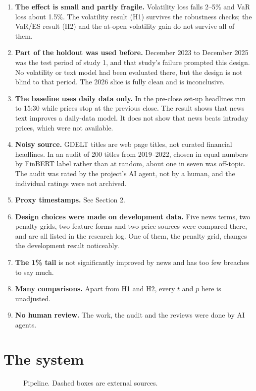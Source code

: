 \documentclass[11pt,a4paper]{article}
\begin{document}
\begin{enumerate}
\item \textbf{The effect is small and partly fragile.} Volatility loss falls 2--5\% and VaR
loss about 1.5\%. The volatility result (H1) survives the robustness checks; the VaR/ES result
(H2) and the at-open volatility gain do not survive all of them.
\item \textbf{Part of the holdout was used before.} December 2023 to December 2025 was the test
period of study 1, and that study's failure prompted this design. No volatility or text model
had been evaluated there, but the design is not blind to that period. The 2026 slice is fully
clean and is inconclusive.
\item \textbf{The baseline uses daily data only.} In the pre-close set-up headlines run to
15:30 while prices stop at the previous close. The result shows that news text improves a
daily-data model. It does not show that news beats intraday prices, which were not available.
\item \textbf{Noisy source.} GDELT titles are web page titles, not curated financial headlines.
In an audit of 200 titles from 2019--2022, chosen in equal numbers by FinBERT label rather than
at random, about one in seven was off-topic. The audit was rated by the project's AI agent,
not by a human, and the individual ratings were not archived.
\item \textbf{Proxy timestamps.} See Section 2.
\item \textbf{Design choices were made on development data.} Five news terms, two penalty grids,
two feature forms and two price sources were compared there, and are all listed in the research
log. One of them, the penalty grid, changes the development result noticeably.
\item \textbf{The 1\% tail} is not significantly improved by news and has too few breaches to
say much.
\item \textbf{Many comparisons.} Apart from H1 and H2, every $t$ and $p$ here is unadjusted.
\item \textbf{No human review.} The work, the audit and the reviews were done by AI agents.
\end{enumerate}

\section{The system}

\begin{figure}[h]
\centering
\pipelinediagram
\caption{Pipeline. Dashed boxes are external sources.}
\end{figure}
\end{document}
